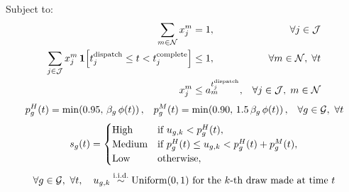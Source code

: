Subject to:
\begin{align}
\sum_{m \in \mathcal{N}} x_j^m &= 1, & \forall j \in \mathcal{J} \label{eq:single_assign}\\
\sum_{j \in \mathcal{J}} x_j^m \, \mathbf{1}\!\left[t_j^{\text{dispatch}} \leq t < t_j^{\text{complete}}\right] &\leq 1, & \forall m \in \mathcal{N},\; \forall t \label{eq:single_job_node}\\
x_j^m &\leq a_m^{t_j^{\text{dispatch}}}, & \forall j \in \mathcal{J},\; m \in \mathcal{N} \label{eq:avail}
\end{align}
\begin{align}
p^{H}_g(t) &= \min\!\left(0.95,\, \beta_g\, \phi(t)\right), & p^{M}_g(t) &= \min\!\left(0.90,\, 1.5\,\beta_g\, \phi(t)\right), & \forall g \in \mathcal{G},\ \forall t \label{eq:stockprob}
\end{align}
\begin{equation}
\begin{gathered}
s_g(t) =
\begin{cases}
\text{High} & \text{if } u_{g,k} < p^{H}_g(t),\\
\text{Medium} & \text{if } p^{H}_g(t) \le u_{g,k} < p^{H}_g(t) + p^{M}_g(t),\\
\text{Low} & \text{otherwise},
\end{cases}\\[0.5ex]
\forall g \in \mathcal{G},\ \forall t,\quad u_{g,k} \overset{\text{i.i.d.}}{\sim} \text{Uniform}(0,1)\ \text{for the $k$-th draw made at time $t$}
\end{gathered}
\label{eq:stock}
\end{equation}
\begingroup
\allowdisplaybreaks

